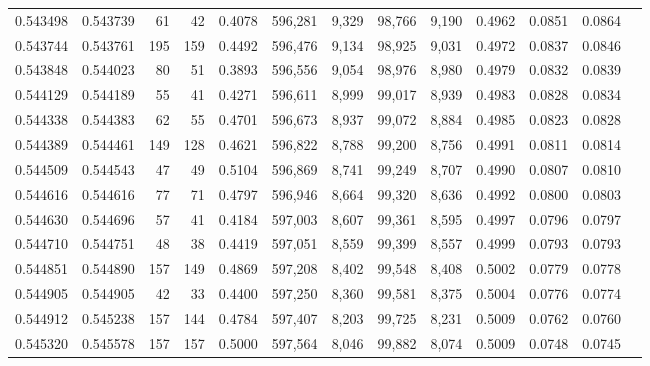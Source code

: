 \begin{tabular}{rrrrrrrrrrrrr}
0.543498 & 0.543739 &    61 &    42 &                                     0.4078 & 596,281 &   9,329 &  98,766 &   9,190 & 0.4962 & 0.0851 & 0.0864 \\
0.543744 & 0.543761 &   195 &   159 &                                     0.4492 & 596,476 &   9,134 &  98,925 &   9,031 & 0.4972 & 0.0837 & 0.0846 \\
0.543848 & 0.544023 &    80 &    51 &                                     0.3893 & 596,556 &   9,054 &  98,976 &   8,980 & 0.4979 & 0.0832 & 0.0839 \\
0.544129 & 0.544189 &    55 &    41 &                                     0.4271 & 596,611 &   8,999 &  99,017 &   8,939 & 0.4983 & 0.0828 & 0.0834 \\
0.544338 & 0.544383 &    62 &    55 &                                     0.4701 & 596,673 &   8,937 &  99,072 &   8,884 & 0.4985 & 0.0823 & 0.0828 \\
0.544389 & 0.544461 &   149 &   128 &                                     0.4621 & 596,822 &   8,788 &  99,200 &   8,756 & 0.4991 & 0.0811 & 0.0814 \\
0.544509 & 0.544543 &    47 &    49 &                                     0.5104 & 596,869 &   8,741 &  99,249 &   8,707 & 0.4990 & 0.0807 & 0.0810 \\
0.544616 & 0.544616 &    77 &    71 &                                     0.4797 & 596,946 &   8,664 &  99,320 &   8,636 & 0.4992 & 0.0800 & 0.0803 \\
0.544630 & 0.544696 &    57 &    41 &                                     0.4184 & 597,003 &   8,607 &  99,361 &   8,595 & 0.4997 & 0.0796 & 0.0797 \\
0.544710 & 0.544751 &    48 &    38 &                                     0.4419 & 597,051 &   8,559 &  99,399 &   8,557 & 0.4999 & 0.0793 & 0.0793 \\
0.544851 & 0.544890 &   157 &   149 &                                     0.4869 & 597,208 &   8,402 &  99,548 &   8,408 & 0.5002 & 0.0779 & 0.0778 \\
0.544905 & 0.544905 &    42 &    33 &                                     0.4400 & 597,250 &   8,360 &  99,581 &   8,375 & 0.5004 & 0.0776 & 0.0774 \\
0.544912 & 0.545238 &   157 &   144 &                                     0.4784 & 597,407 &   8,203 &  99,725 &   8,231 & 0.5009 & 0.0762 & 0.0760 \\
0.545320 & 0.545578 &   157 &   157 &                                     0.5000 & 597,564 &   8,046 &  99,882 &   8,074 & 0.5009 & 0.0748 & 0.0745 \\

\end{tabular}
